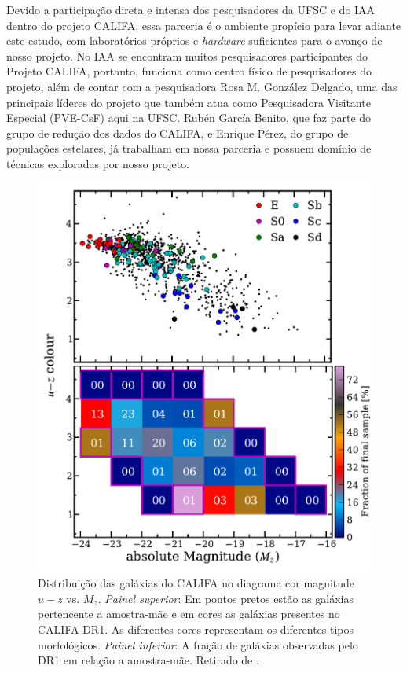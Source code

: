 \documentclass[a4paper,12pt]{article}
\begin{document}
Devido a participação direta e intensa dos pesquisadores da UFSC e do IAA dentro do projeto CALIFA, essa parceria é o ambiente propício para levar
adiante este estudo, com laboratórios próprios e {\em hardware} suficientes para o avanço de nosso projeto. No IAA se encontram muitos pesquisadores
participantes do Projeto CALIFA, portanto, funciona como centro físico de pesquisadores do projeto, além de contar com a pesquisadora Rosa M. González
Delgado, uma das principais líderes do projeto que também atua como Pesquisadora Visitante Especial (PVE-CsF) aqui na UFSC. Rubén García Benito,
que faz parte do grupo de redução dos dados do CALIFA, e Enrique Pérez, do grupo de populações estelares, já trabalham em nossa parceria e possuem
domínio de técnicas exploradas por nosso projeto.

\begin{figure}
	\begin{center}
    \includegraphics[height=0.5\textwidth]{figuras/figHusemann2013Fig2.pdf}
    \caption[Diagrama cor-magnitude para as galáxias do CALIFA.]
    {Distribui\c{c}\~ao das galáxias do CALIFA no diagrama cor magnitude $u-z$ vs. $M_z$. {\em Painel superior}: Em pontos pretos est\~ao as galáxias
    pertencente a amostra-m\~ae e em cores as galáxias presentes no CALIFA DR1. As diferentes cores representam os diferentes tipos morfológicos.
    {\em Painel inferior}: A fra\c{c}\~ao de galáxias observadas pelo DR1 em rela\c{c}\~ao a amostra-m\~ae. Retirado de \citet{Husemann2013}.}
    \label{fig:cm-uzMz}
    \end{center}
\end{figure}
\end{document}
